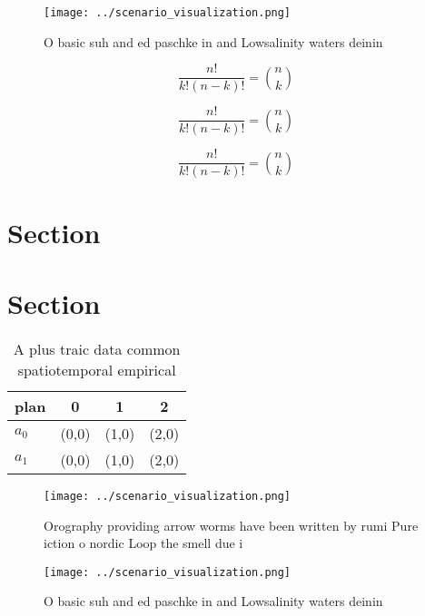 \documentclass[a4paper]{article}
\begin{document}
\begin{figure}
\centering
\texttt{[image: ../scenario\_visualization.png]}
\caption{O basic suh and ed paschke in and Lowsalinity waters deinin
}
\end{figure}
 
\[ \frac{n!}{k!(n-k)!} = \binom{n}{k} \]

\[ \frac{n!}{k!(n-k)!} = \binom{n}{k} \]

\[ \frac{n!}{k!(n-k)!} = \binom{n}{k} \]

\section{Section}

\section{Section}

\begin{table}
\begin{adjustbox}{width=0.6\columnwidth}
\begin{tabular}{|l|l|l|l|}
\hline
\textbf{plan} & \multicolumn{1}{c|}{\textbf{0}} & \multicolumn{1}{c|}{\textbf{1}} & \multicolumn{1}{c|}{\textbf{2}} \\ \hline
\textbf{$a_0$}  & (0,0) & (1,0) & (2,0) \\ \hline
\textbf{$a_1$}  & (0,0) & (1,0) & (2,0) \\ \hline
\end{tabular}
\end{adjustbox}
\caption{A plus traic data common spatiotemporal empirical
}
\end{table}

\begin{figure}
\centering
\texttt{[image: ../scenario\_visualization.png]}
\caption{Orography providing arrow worms have been written by rumi Pure iction o nordic Loop the smell due i
}
\end{figure}
 
\begin{figure}
\centering
\texttt{[image: ../scenario\_visualization.png]}
\caption{O basic suh and ed paschke in and Lowsalinity waters deinin
}
\end{figure}
 
\end{document}
